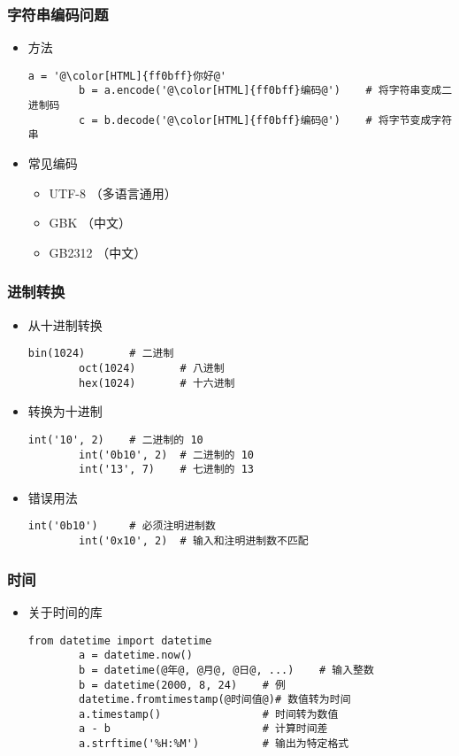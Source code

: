 \begin{CJK}{UTF8}{gbsn}
\begin{frame} [fragile]
	\frametitle{字符串编码问题}
	\linespread{1.25}
	\begin{itemize}
	\item 方法
		\begin{lstlisting}[style=pythonstyle, gobble=8, texcl, escapechar=@]
		a = '@\color[HTML]{ff0bff}你好@'
		b = a.encode('@\color[HTML]{ff0bff}编码@')	# 将字符串变成二进制码
		c = b.decode('@\color[HTML]{ff0bff}编码@')	# 将字节变成字符串
		\end{lstlisting}
	\item 常见编码
		\begin{itemize}
		\item UTF-8 （多语言通用）
		\item GBK （中文）
		\item GB2312 （中文）
		\end{itemize}
	\end{itemize}
\end{frame}

\begin{frame} [fragile]
	\frametitle{进制转换}
	\begin{itemize}
	\item 从十进制转换
		\begin{lstlisting}[style=pythonstyle, gobble=8, texcl]
		bin(1024)		# 二进制
		oct(1024)		# 八进制
		hex(1024)		# 十六进制
		\end{lstlisting}
	\item 转换为十进制
		\begin{lstlisting}[style=pythonstyle, gobble=8, texcl]
		int('10', 2)	# 二进制的 10
		int('0b10', 2)	# 二进制的 10
		int('13', 7)	# 七进制的 13
		\end{lstlisting}
	\item 错误用法
		\begin{lstlisting}[style=pythonstyle, gobble=8, texcl]
		int('0b10')		# 必须注明进制数
		int('0x10', 2)	# 输入和注明进制数不匹配
		\end{lstlisting}
	\end{itemize}
\end{frame}

\begin{frame} [fragile]
	\frametitle{时间}
	\linespread{1.25}
	\begin{itemize}
	\item 关于时间的库
		\begin{lstlisting}[style=pythonstyle, gobble=8, texcl, escapechar=@]
		from datetime import datetime
		a = datetime.now()
		b = datetime(@年@, @月@, @日@, ...)	# 输入整数
		b = datetime(2000, 8, 24)	 # 例
		datetime.fromtimestamp(@时间值@)# 数值转为时间
		a.timestamp()				 # 时间转为数值
		a - b						 # 计算时间差
		a.strftime('%H:%M')			 # 输出为特定格式
		\end{lstlisting}
	\end{itemize}
\end{frame}


\end{CJK}
